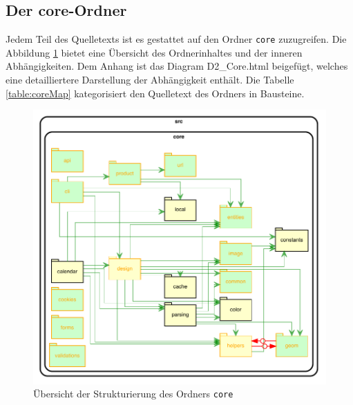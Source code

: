 \subsection{Der core-Ordner}

Jedem Teil des Quelletexts ist es gestattet auf den Ordner \lstinline|core| zuzugreifen.
Die Abbildung \ref{fig:core-sturktur} bietet eine Übersicht des Ordnerinhaltes und der inneren Abhängigkeiten.
Dem Anhang ist das Diagram D2\_Core.html beigefügt, welches eine detailliertere Darstellung der Abhängigkeit enthält.
Die Tabelle \ref{table:coreMap} kategorisiert den Quelletext des Ordners in Bausteine.

\begin{figure}[H]
    \centering
    \includegraphics[width=\textwidth]{diagrams/Ist-Architektur/core-graph.pdf}
    \caption{Übersicht der Strukturierung des Ordners \lstinline|core|}
    \label{fig:core-sturktur}
\end{figure}

